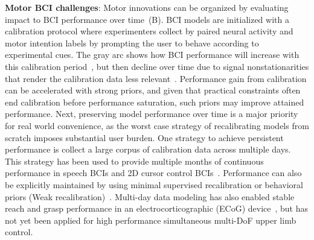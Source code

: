 \documentclass[12pt,oneside]{report}
\begin{document}
\textbf{Motor BCI challenges}: Motor innovations can be organized by evaluating impact to BCI performance over time~(B). BCI models are initialized with a calibration protocol where experimenters collect by paired neural activity and motor intention labels by prompting the user to behave according to experimental cues. The gray arc shows how BCI performance will increase with this calibration period~\citep{makin_18_refh}, but then decline over time due to signal nonstationarities that render the calibration data less relevant~\citep{karpowicz2022stabilizing}. Performance gain from calibration can be accelerated with strong priors, and given that practical constraints often end calibration before performance saturation, such priors may improve attained performance. Next, preserving model performance over time is a major priority for real world convenience, as the worst case strategy of recalibrating models from scratch imposes substantial user burden. One strategy to achieve persistent performance is collect a large corpus of calibration data across multiple days. This strategy has been used to provide multiple months of continuous performance in speech BCIs and 2D cursor control BCIs~\citep{willett_23_speech,card2024accurate,sussillo_16_future,hosman2023months}. Performance can also be explicitly maintained by using minimal supervised recalibration or behavioral priors (Weak recalibration)~\citep{wilson_23_prit,fan2023plugandplay}.
Multi-day data modeling has also enabled stable reach and grasp performance in an electrocorticographic (ECoG) device~\citep{Natraj2025robot}, but has not yet been applied for high performance simultaneous multi-DoF upper limb control.
\end{document}
